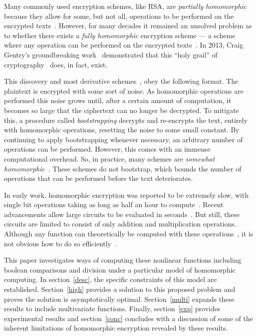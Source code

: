\documentclass{article}
\begin{document}
        Many commonly used encryption schemes, like RSA, are \emph{partially homomorphic} because they
        allow for some, but not all, operations to be performed on the encrypted texts~\cite{rivest}.
        However, for many decades it remained an unsolved problem as to whether there exists
        a \emph{fully homomorphic} encryption scheme --- a scheme where any operation can be performed
        on the encrypted texts~\cite{rivest}.
        In 2013, Craig Gentry's groundbreaking work~\cite{homenc,firstImp} demonstrated that this ``holy grail'' of cryptography~\cite{grail}
        does, in fact, exist.

        This discovery and most derivative schemes~\cite{homenc,firstImp,yashe,faster,shorter,lwe,depth,leveled,gapsvp,smaller,integers},
        obey the following format.
        The plaintext is encrypted with some sort of noise.
        As homomorphic operations are performed this noise grows until,
        after a certain amount of computation,
        it becomes so large that the ciphertext can no longer be decrypted.
        To mitigate this,
        a procedure called \emph{bootstrapping} decrypts and re-encrypts the text,
        entirely with homomorphic operations, resetting the noise to some small constant.
        By continuing to apply bootstrapping whenever necessary, an arbitrary number
        of operations can be performed.
        However, this comes with an immense computational overhead.
        So, in practice, many schemes are \emph{somewhat homomorphic}~\cite{firstImp,homenc}.
        These schemes do not bootstrap, which bounds the number of operations that can be performed
        before the text deteriorates.

        In early work,
        homomorphic encryption was reported to be extremely slow, with
        single bit operations taking as long as half an hour to compute~\cite{firstImp}.
        Recent advancements allow large circuits to be evaluated in seconds~\cite{yashe,somewhat}.
        But still, these circuits are limited to consist of only addition and multiplication operations.
        Although any function can theoretically be computed with these operations~\cite{homenc},
        it is not obvious how to do so efficiently~\cite{newton,aes,genomic,fixedpoint}.

        This paper investigates ways of computing these nonlinear
        functions including
        boolean comparisons and division under a particular model of homomorphic computing.
        In section~\ref{desc}, the specific constraints of this model are established.
        Section~\ref{high} provides a solution to this proposed problem and proves the solution is asymptotically optimal.
        Section~\ref{multi} expands these results to include multivariate functions.
        Finally, section~\ref{exp} provides experimental results and section~\ref{conc}
        concludes with a discussion of some of the inherent limitations of homomorphic encryption revealed by these results.
\end{document}
